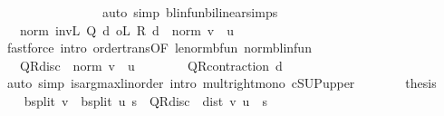 \begin{isabellebody}
\ \ \ \ \ \ \isamarkupfalse%
\ {\isacharasterisk}{\kern0pt}\isanewline
\ \ \ \ \ \ \isamarkupfalse%
\ {\isacharparenleft}{\kern0pt}auto\ simp{\isacharcolon}{\kern0pt}\ blinfun{\isachardot}{\kern0pt}bilinear{\isacharunderscore}{\kern0pt}simps{\isacharparenright}{\kern0pt}\isanewline
\ \ \ \ \isamarkupfalse%
\ \isamarkupfalse%
\ {\isachardoublequoteopen}{\isasymdots}\ {\isasymle}\ norm\ {\isacharparenleft}{\kern0pt}{\isacharparenleft}{\kern0pt}inv\isactrlsub L\ {\isacharparenleft}{\kern0pt}Q\ d{\isacharparenright}{\kern0pt}\ o\isactrlsub L\ R\ d{\isacharparenright}{\kern0pt}{\isacharparenright}{\kern0pt}\ {\isacharasterisk}{\kern0pt}\ norm\ {\isacharparenleft}{\kern0pt}v\ {\isacharminus}{\kern0pt}\ u{\isacharparenright}{\kern0pt}{\isachardoublequoteclose}\isanewline
\ \ \ \ \ \ \isamarkupfalse%
\ {\isacharparenleft}{\kern0pt}fastforce\ intro{\isacharcolon}{\kern0pt}\ order{\isachardot}{\kern0pt}trans{\isacharbrackleft}{\kern0pt}OF\ le{\isacharunderscore}{\kern0pt}norm{\isacharunderscore}{\kern0pt}bfun\ norm{\isacharunderscore}{\kern0pt}blinfun{\isacharbrackright}{\kern0pt}{\isacharparenright}{\kern0pt}\isanewline
\ \ \ \ \isamarkupfalse%
\ \isamarkupfalse%
\ {\isachardoublequoteopen}{\isasymdots}\ {\isasymle}\ QR{\isacharunderscore}{\kern0pt}disc\ {\isacharasterisk}{\kern0pt}\ norm\ {\isacharparenleft}{\kern0pt}v\ {\isacharminus}{\kern0pt}\ u{\isacharparenright}{\kern0pt}{\isachardoublequoteclose}\isanewline
\ \ \ \ \ \ \isamarkupfalse%
\ QR{\isacharunderscore}{\kern0pt}contraction\ d\isanewline
\ \ \ \ \ \ \isamarkupfalse%
\ {\isacharparenleft}{\kern0pt}auto\ simp{\isacharcolon}{\kern0pt}\ is{\isacharunderscore}{\kern0pt}arg{\isacharunderscore}{\kern0pt}max{\isacharunderscore}{\kern0pt}linorder\ intro{\isacharbang}{\kern0pt}{\isacharcolon}{\kern0pt}\ mult{\isacharunderscore}{\kern0pt}right{\isacharunderscore}{\kern0pt}mono\ cSUP{\isacharunderscore}{\kern0pt}upper{}{\isacharparenright}{\kern0pt}\isanewline
\ \ \ \ \isamarkupfalse%
\ \isamarkupfalse%
\ {\isacharquery}{\kern0pt}thesis\isacommand{{\isachardot}{\kern0pt}}\isamarkupfalse%
\isanewline
\ \ \isamarkupfalse%
\isanewline
\ \ \isamarkupfalse%
\ {\isachardoublequoteopen}{\isasymbar}{\isacharparenleft}{\kern0pt}{\isasymL}\isactrlsub b{\isacharunderscore}{\kern0pt}split\ v\ {\isacharminus}{\kern0pt}\ {\isasymL}\isactrlsub b{\isacharunderscore}{\kern0pt}split\ u{\isacharparenright}{\kern0pt}\ s{\isasymbar}\ {\isasymle}\ QR{\isacharunderscore}{\kern0pt}disc\ {\isacharasterisk}{\kern0pt}\ dist\ v\ u{\isachardoublequoteclose}\ \ s\isanewline

\end{isabellebody}
